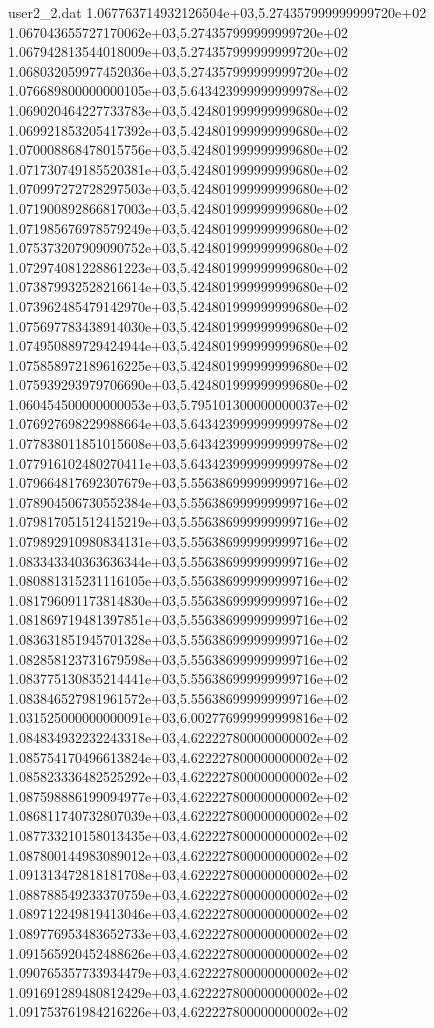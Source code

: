 \begin{filecontents}{user2_2.dat}
1.067763714932126504e+03,5.274357999999999720e+02
1.067043655727170062e+03,5.274357999999999720e+02
1.067942813544018009e+03,5.274357999999999720e+02
1.068032059977452036e+03,5.274357999999999720e+02
1.076689800000000105e+03,5.643423999999999978e+02
1.069020464227733783e+03,5.424801999999999680e+02
1.069921853205417392e+03,5.424801999999999680e+02
1.070008868478015756e+03,5.424801999999999680e+02
1.071730749185520381e+03,5.424801999999999680e+02
1.070997272728297503e+03,5.424801999999999680e+02
1.071900892866817003e+03,5.424801999999999680e+02
1.071985676978579249e+03,5.424801999999999680e+02
1.075373207909090752e+03,5.424801999999999680e+02
1.072974081228861223e+03,5.424801999999999680e+02
1.073879932528216614e+03,5.424801999999999680e+02
1.073962485479142970e+03,5.424801999999999680e+02
1.075697783438914030e+03,5.424801999999999680e+02
1.074950889729424944e+03,5.424801999999999680e+02
1.075858972189616225e+03,5.424801999999999680e+02
1.075939293979706690e+03,5.424801999999999680e+02
1.060454500000000053e+03,5.795101300000000037e+02
1.076927698229988664e+03,5.643423999999999978e+02
1.077838011851015608e+03,5.643423999999999978e+02
1.077916102480270411e+03,5.643423999999999978e+02
1.079664817692307679e+03,5.556386999999999716e+02
1.078904506730552384e+03,5.556386999999999716e+02
1.079817051512415219e+03,5.556386999999999716e+02
1.079892910980834131e+03,5.556386999999999716e+02
1.083343340363636344e+03,5.556386999999999716e+02
1.080881315231116105e+03,5.556386999999999716e+02
1.081796091173814830e+03,5.556386999999999716e+02
1.081869719481397851e+03,5.556386999999999716e+02
1.083631851945701328e+03,5.556386999999999716e+02
1.082858123731679598e+03,5.556386999999999716e+02
1.083775130835214441e+03,5.556386999999999716e+02
1.083846527981961572e+03,5.556386999999999716e+02
1.031525000000000091e+03,6.002776999999999816e+02
1.084834932232243318e+03,4.622227800000000002e+02
1.085754170496613824e+03,4.622227800000000002e+02
1.085823336482525292e+03,4.622227800000000002e+02
1.087598886199094977e+03,4.622227800000000002e+02
1.086811740732807039e+03,4.622227800000000002e+02
1.087733210158013435e+03,4.622227800000000002e+02
1.087800144983089012e+03,4.622227800000000002e+02
1.091313472818181708e+03,4.622227800000000002e+02
1.088788549233370759e+03,4.622227800000000002e+02
1.089712249819413046e+03,4.622227800000000002e+02
1.089776953483652733e+03,4.622227800000000002e+02
1.091565920452488626e+03,4.622227800000000002e+02
1.090765357733934479e+03,4.622227800000000002e+02
1.091691289480812429e+03,4.622227800000000002e+02
1.091753761984216226e+03,4.622227800000000002e+02

\end{filecontents}

